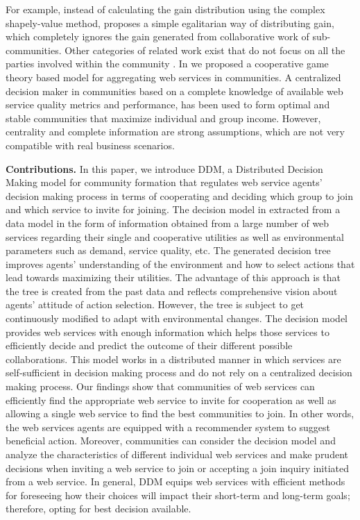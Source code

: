 For example, instead of calculating the gain distribution using the complex shapely-value method, \cite{10.1109/TSC.2012.12} proposes a simple egalitarian way of distributing gain, which completely ignores the gain generated from collaborative work of sub-communities. Other categories of related work exist that do not focus on all the parties involved within the community \cite{DBLP:conf/IEEEscc/KhosravifarABT11}.
In \cite{journal-community-formation} we proposed a cooperative game theory based model for aggregating web services in communities. A centralized decision maker in communities based on a complete knowledge of available web service quality metrics and performance, has been used to form optimal and stable communities that maximize individual and group income. However, centrality and complete information are strong assumptions, which are not very compatible with real business scenarios.

\textbf{Contributions.} In this paper, we introduce DDM, a Distributed Decision Making model for  community formation that regulates web service agents’ decision making process in terms of cooperating and deciding which group to join and which service to invite for joining. The decision model in extracted from a data model in the form of information obtained from a large number of web services regarding their single and cooperative utilities as well as environmental parameters such as demand, service quality, etc. The generated decision tree improves agents' understanding of the environment and how to select actions that lead towards maximizing their utilities. The advantage of this approach is that the tree is created from the past data and reflects comprehensive vision about agents' attitude of action selection. However, the tree is subject to get continuously modified to adapt with environmental changes.
The decision model provides web services with enough information which helps those services to efficiently decide and predict the outcome of their different possible collaborations. This model works in a distributed manner in which services are self-sufficient in decision making process and do not rely on a centralized decision making process. Our findings show that communities of web services can efficiently find the appropriate web service to invite for cooperation as well as allowing a single web service to find the best communities to join. In other words, the web services agents are equipped with a recommender system to suggest beneficial action. Moreover, communities can consider the decision model and analyze the characteristics of different individual web services and make prudent decisions when inviting a web service to join or accepting a join inquiry initiated from a web service. In general, DDM equips web services with efficient methods for foreseeing how their choices will impact their short-term and long-term goals; therefore, opting for best decision available.

